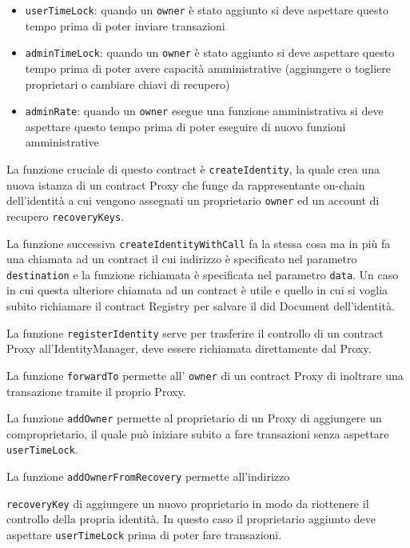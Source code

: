\begin{itemize}
  \begin{itemize}
      \item \texttt{userTimeLock}: quando un \texttt{owner} è stato aggiunto si deve aspettare
        questo tempo prima di poter inviare transazioni
      \item \texttt{adminTimeLock}: quando un \texttt{owner} è stato aggiunto si deve aspettare questo tempo
        prima di poter avere capacità amministrative (aggiungere o togliere proprietari o cambiare
        chiavi di recupero)
      \item \texttt{adminRate}: quando un \texttt{owner} esegue una funzione amministrativa si deve aspettare
        questo tempo prima di poter eseguire di nuovo funzioni amministrative
  \end{itemize}

  La funzione cruciale di questo contract è \texttt{createIdentity}, la quale crea una nuova istanza
  di un contract Proxy che funge da rappresentante on-chain dell'identità a cui vengono assegnati un
  proprietario \texttt{owner} ed un account di recupero \texttt{recoveryKeys}.

  La funzione successiva \texttt{createIdentityWithCall} fa la stessa cosa ma in più fa una chiamata
  ad un contract il cui indirizzo è specificato nel parametro \texttt{destination} e la funzione richiamata
  è specificata nel parametro \texttt{data}. Un caso in cui questa ulteriore chiamata ad un contract
  è utile e quello in cui si voglia subito richiamare il contract Registry per salvare il did
  Document dell'identità.

  La funzione \texttt{registerIdentity} serve per trasferire il controllo di un contract Proxy all'IdentityManager,
  deve essere richiamata direttamente dal Proxy.

  La funzione \texttt{forwardTo} permette all' \texttt{owner} di un contract Proxy di inoltrare una
  transazione tramite il proprio Proxy.

  La funzione \texttt{addOwner} permette al proprietario di un Proxy di aggiungere un comproprietario,
  il quale può iniziare subito a fare transazioni senza aspettare \texttt{userTimeLock}.

  La funzione \texttt{addOwnerFromRecovery} permette all'indirizzo 

  \texttt{recoveryKey} di aggiungere un nuovo proprietario in modo da riottenere il
  controllo della propria identità. In questo caso
  il proprietario aggiunto deve aspettare \texttt{userTimeLock} prima di poter fare transazioni.


\end{itemize}
